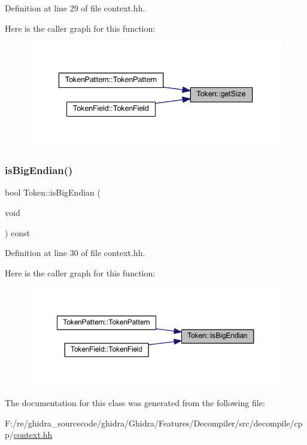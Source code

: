 Definition at line 29 of file context.\+hh.

Here is the caller graph for this function\+:
\nopagebreak
\begin{figure}[H]
\begin{center}
\leavevmode
\includegraphics[width=336pt]{class_token_a2151b6987a4821ecfbd527973de5219e_icgraph}
\end{center}
\end{figure}
\mbox{\label{class_token_ae5f6fe0959a697bb332e3c957f166941}} 
\subsubsection{\texorpdfstring{isBigEndian()}{isBigEndian()}}
{\footnotesize\ttfamily bool Token\+::is\+Big\+Endian (\begin{DoxyParamCaption}\item[{void}]{ }\end{DoxyParamCaption}) const\hspace{0.3cm}{\ttfamily [inline]}}



Definition at line 30 of file context.\+hh.

Here is the caller graph for this function\+:
\nopagebreak
\begin{figure}[H]
\begin{center}
\leavevmode
\includegraphics[width=350pt]{class_token_ae5f6fe0959a697bb332e3c957f166941_icgraph}
\end{center}
\end{figure}


The documentation for this class was generated from the following file\+:\begin{DoxyCompactItemize}
\item 
F\+:/re/ghidra\+\_\+sourcecode/ghidra/\+Ghidra/\+Features/\+Decompiler/src/decompile/cpp/\mbox{\hyperlink{context_8hh}{context.\+hh}}\end{DoxyCompactItemize}
